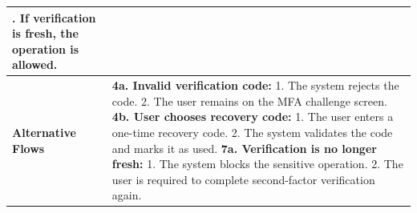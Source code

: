 \begin{longtable}{|>{\raggedright\arraybackslash}p{}|>{\raggedright\arraybackslash}p{}|}
8. If verification is fresh, the operation is allowed. \\ \hline
\textbf{Alternative Flows} &
\textbf{4a. Invalid verification code:} \newline
\hspace*{1em}1. The system rejects the code. \newline
\hspace*{1em}2. The user remains on the MFA challenge screen. \newline
\textbf{4b. User chooses recovery code:} \newline
\hspace*{1em}1. The user enters a one-time recovery code. \newline
\hspace*{1em}2. The system validates the code and marks it as used. \newline
\textbf{7a. Verification is no longer fresh:} \newline
\hspace*{1em}1. The system blocks the sensitive operation. \newline
\hspace*{1em}2. The user is required to complete second-factor verification again. \\
\end{longtable}

